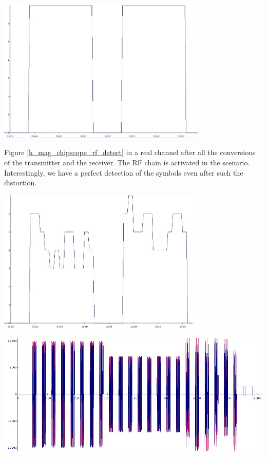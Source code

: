 \begin{center}
\includegraphics[width=10cm]{content/fig/h_mag_chipscope_noChannel.JPG}
\label{h_mag_chipscope_noChannel}
\end{center}

Figure \ref{h_mag_chipscope_rf_detect} in a real channel after all the conversions of the transmitter and the receiver. The RF chain is activated in the scenario. Interestingly, we have a perfect detection of the symbols even after such the distortion.\\

\begin{center}
\includegraphics[width=10cm]{content/fig/h_mag_chipscope_rf_detect.JPG}
\label{h_mag_chipscope_rf_detect}
\end{center}

\begin{center}
\includegraphics[width=\textwidth]{content/fig/OfdmSym_16qam_1_2_code_64byte.JPG}
\label{OfdmSym_16qam_1_2_code_64byte}
\end{center}

